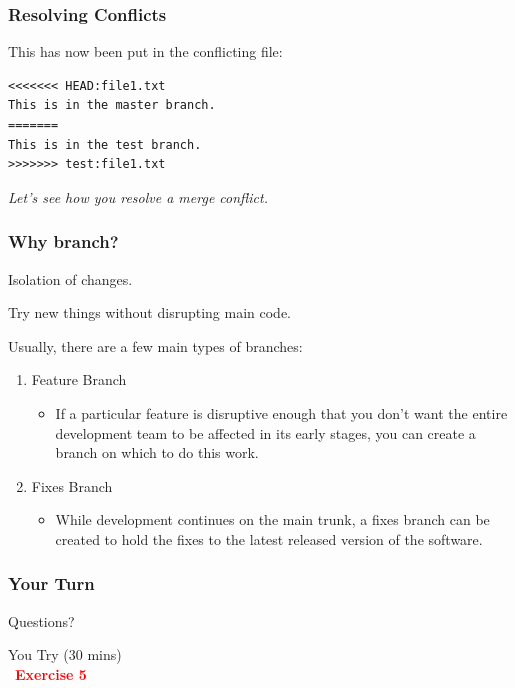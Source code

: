 \documentclass{beamer}
\begin{document}
\begin{frame}[fragile]
\frametitle{Resolving Conflicts}
This has now been put in the conflicting file:
\begin{verbatim}
<<<<<<< HEAD:file1.txt
This is in the master branch.
=======
This is in the test branch.
>>>>>>> test:file1.txt
\end{verbatim}\pause
\textit{Let's see how you resolve a merge conflict.}
\end{frame}


\begin{frame}
\frametitle{Why branch?}
\begin{center}
Isolation of changes. \pause
\vspace{15pt}

Try new things without disrupting main code. 
\end{center} \pause

Usually, there are a few main types of branches:
\begin{enumerate}
\item Feature Branch
\begin{itemize}
\item If a particular feature is disruptive enough that you don't want the entire development team to be affected in its early stages, you can create a branch on which to do this work.
\end{itemize}
\item Fixes Branch
\begin{itemize}
\item While development continues on the main trunk, a fixes branch can be created to hold the fixes to the latest released version of the software.
\end{itemize}
\end{enumerate} 
\end{frame}


\begin{frame}
\frametitle{Your Turn}
\begin{center}
Questions? \pause
\vspace{30pt}

You Try (30 mins) \\\
\textbf{\textcolor{red}{Exercise 5}}
\end{center}
\end{frame}
\end{document}
